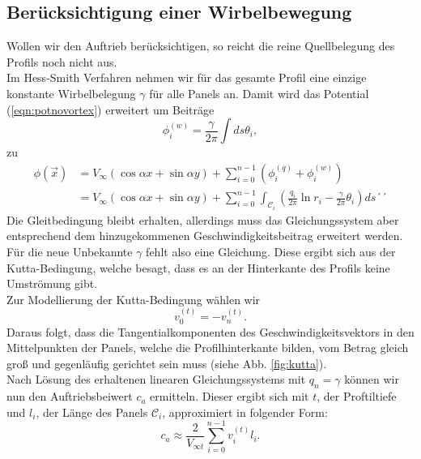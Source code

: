 \subsection{Berücksichtigung einer Wirbelbewegung}
Wollen wir den Auftrieb berücksichtigen, so reicht die reine Quellbelegung des Profils noch nicht aus. \\
Im Hess-Smith Verfahren nehmen wir für das gesamte Profil eine einzige konstante Wirbelbelegung $\gamma$ für alle Panels an. Damit wird das Potential (\ref{eqn:potnovortex}) erweitert um Beiträge
\begin{equation}
\phi_i^{(w)} =  \frac{\gamma}{2 \pi } \int ds \theta_i,
\end{equation}
zu
\begin{align}
\phi(\vec x) &=  V_{\infty} (\cos \alpha x + \sin \alpha y) + \sum_{i=0}^{n-1} \left( \phi_i^{(q)} + \phi_i^{(w)} \right) \nonumber \\
&= V_{\infty} (\cos \alpha x + \sin \alpha y) + \sum_{i=0}^{n-1} \int_{\mathcal{C}_i} \left( \frac{q_i}{2\pi } \ln r_i - \frac{\gamma}{2\pi } \theta_{i} \right) ds ´´
\end{align}
Die Gleitbedingung bleibt erhalten, allerdings muss das Gleichungssystem aber entsprechend dem hinzugekommenen Geschwindigkeitsbeitrag erweitert werden. Für die neue Unbekannte $\gamma$ fehlt also eine Gleichung. Diese ergibt sich aus der Kutta-Bedingung, welche besagt, dass es an der Hinterkante des Profils keine Umströmung gibt.\\
Zur Modellierung der Kutta-Bedingung wählen wir
\begin{equation}
v_0^{(t)} =  -v_n^{(t)}.
\end{equation} 
Daraus folgt, dass die Tangentialkomponenten des Geschwindigkeitsvektors in den Mittelpunkten der Panels, welche die Profilhinterkante bilden, vom Betrag gleich groß und gegenläufig gerichtet sein muss (siehe Abb. \ref{fig:kutta}). \\
Nach Lösung des erhaltenen linearen Gleichungssystems mit $q_n = \gamma$ können wir nun den Auftriebsbeiwert $c_a$ ermitteln. Dieser ergibt sich mit $t$, der Proftiltiefe und $l_i$, der Länge des Panels $\mathcal{C}_i$, approximiert in folgender Form:
\begin{equation}
c_a \approx \frac{2}{V_{\infty t}}\sum_{i=0}^{n-1} v_i^{(t)} l_i.
\end{equation}
